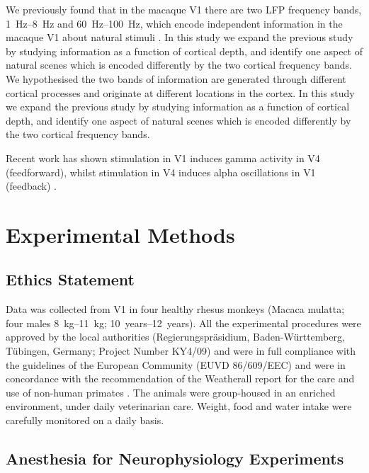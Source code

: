 We previously found that in the macaque \ac{V1} there are two \ac{LFP} frequency bands, \SIrange{1}{8}{Hz} and \SIrange{60}{100}{Hz}, which encode independent information in the macaque \ac{V1} about natural stimuli \citep{Belitski2008}.
In this study we expand the previous study by studying information as a function of cortical depth, and identify one aspect of natural scenes which is encoded differently by the two cortical frequency bands.
We hypothesised the two bands of information are generated through different cortical processes and originate at different locations in the cortex.
In this study we expand the previous study by studying information as a function of cortical depth, and identify one aspect of natural scenes which is encoded differently by the two cortical frequency bands.

Recent work has shown stimulation in \ac{V1} induces gamma activity in \ac{V4} (feedforward), whilst stimulation in \ac{V4} induces alpha oscillations in \ac{V1} (feedback) \citep{VanKerkoerle2014}.


\section{Experimental Methods}

\subsection{Ethics Statement}

Data was collected from \ac{V1} in four healthy rhesus monkeys (Macaca mulatta; four males \SIrange{8}{11}{kg}; \SIrange{10}{12}{years}).
All the experimental procedures were approved by the local authorities (Regierungspr\"asidium, Baden-W\"urttemberg, T\"ubingen, Germany; Project Number KY4/09) and were in full compliance with the guidelines of the European Community (EUVD 86/609/EEC) and were in concordance with the recommendation of the Weatherall report for the care and use of non-human primates \citep{Weatherall2006}.
The animals were group-housed in an enriched environment, under daily veterinarian care.
Weight, food and water intake were carefully monitored on a daily basis.


\subsection{Anesthesia for Neurophysiology Experiments}

